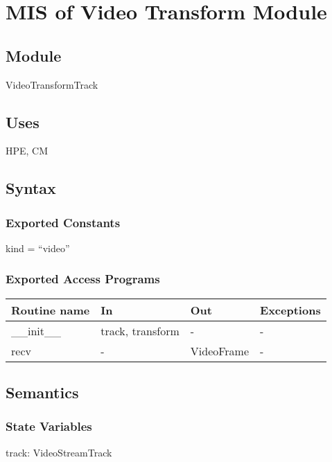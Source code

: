 \documentclass[12pt, titlepage]{article}
\begin{document}
\section{MIS of Video Transform Module} \label{sec:videotransform}

\subsection{Module}
VideoTransformTrack

\subsection{Uses}
HPE, CM

\subsection{Syntax}

\subsubsection{Exported Constants}
kind = ``video''

\subsubsection{Exported Access Programs}
\begin{table}[h!]
  \centering
  \begin{tabular}{llll}
    \hline
    \textbf{Routine name} & \textbf{In}            & \textbf{Out}     & \textbf{Exceptions} \\
    \hline
    \_\_init\_\_    & track, transform & -          & -             \\
    recv            & -                & VideoFrame & -             \\
    \hline
  \end{tabular}
\end{table}

\subsection{Semantics}

\subsubsection{State Variables}

track: VideoStreamTrack
\end{document}
